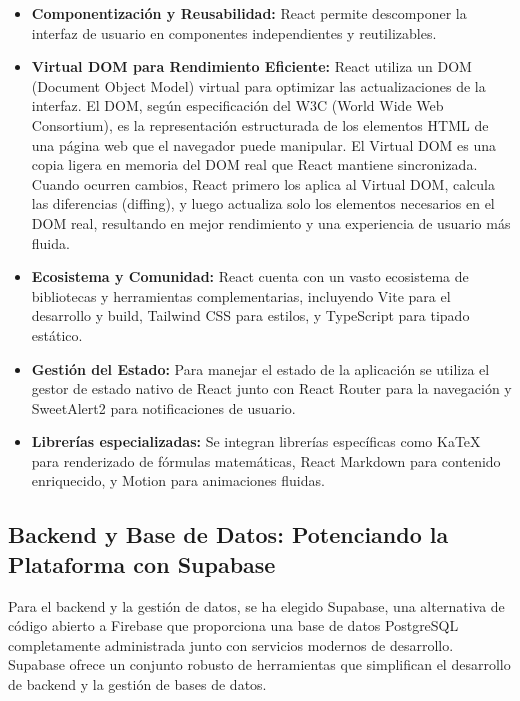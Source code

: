 \documentclass[12pt,a4paper]{report}
\begin{document}
\begin{itemize}
\item \textbf{Componentización y Reusabilidad:} React permite descomponer la interfaz de usuario en componentes independientes y reutilizables.

\item \textbf{Virtual DOM para Rendimiento Eficiente:} React utiliza un DOM (Document Object Model) virtual para optimizar las actualizaciones de la interfaz. El DOM, según especificación del W3C (World Wide Web Consortium), es la representación estructurada de los elementos HTML de una página web que el navegador puede manipular. El Virtual DOM es una copia ligera en memoria del DOM real que React mantiene sincronizada. Cuando ocurren cambios, React primero los aplica al Virtual DOM, calcula las diferencias (diffing), y luego actualiza solo los elementos necesarios en el DOM real, resultando en mejor rendimiento y una experiencia de usuario más fluida.

\item \textbf{Ecosistema y Comunidad:} React cuenta con un vasto ecosistema de bibliotecas y herramientas complementarias, incluyendo Vite para el desarrollo y build, Tailwind CSS para estilos, y TypeScript para tipado estático.

\item \textbf{Gestión del Estado:} Para manejar el estado de la aplicación se utiliza el gestor de estado nativo de React junto con React Router para la navegación y SweetAlert2 para notificaciones de usuario.

\item \textbf{Librerías especializadas:} Se integran librerías específicas como KaTeX para renderizado de fórmulas matemáticas, React Markdown para contenido enriquecido, y Motion para animaciones fluidas.
\end{itemize}

\subsection{Backend y Base de Datos: Potenciando la Plataforma con Supabase}

Para el backend y la gestión de datos, se ha elegido Supabase, una alternativa de código abierto a Firebase que proporciona una base de datos PostgreSQL completamente administrada junto con servicios modernos de desarrollo. Supabase ofrece un conjunto robusto de herramientas que simplifican el desarrollo de backend y la gestión de bases de datos.
\end{document}
